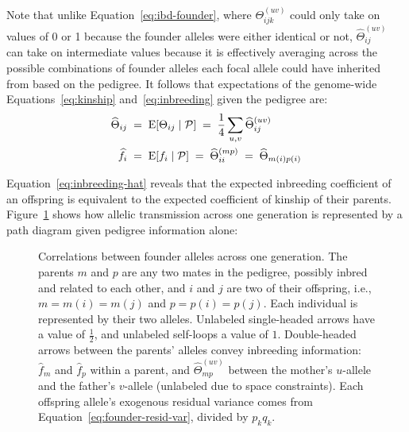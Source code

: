 \documentclass[12pt]{article}
\numberwithin{equation}{section}
\begin{document}
Note that unlike Equation~\eqref{eq:ibd-founder}, where $\Theta^{(uv)}_{ijk}$ could only take on values of 0 or 1 because the founder alleles were either identical or not, $\widehat\Theta^{(uv)}_{ij}$ can take on intermediate values because it is effectively averaging across the possible combinations of founder alleles each focal allele could have inherited from based on the pedigree.
It follows that expectations of the genome-wide Equations~\eqref{eq:kinship} and~\eqref{eq:inbreeding} given the pedigree are:
\begin{subequations}\label{eq:pedigree-coefs}
\begin{align}
    \widehat\Theta_{ij} \;&=\; \mathrm{E}[\Theta_{ij} \mid \mathcal{P}] \;=\; \frac14 \sum_{u,v} \widehat\Theta^{(uv)}_{ij} \label{eq:kinship-hat} \\
    \widehat{f}_i \;&=\; \mathrm{E}[f_i \mid \mathcal{P}] \;=\; \widehat\Theta^{(mp)}_{ii} \;=\; \widehat\Theta_{m(i)p(i)} \label{eq:inbreeding-hat}
\end{align}
\end{subequations}

Equation~\eqref{eq:inbreeding-hat} reveals that the expected inbreeding coefficient of an offspring is equivalent to the expected coefficient of kinship of their parents.
Figure~\ref{fig:ibd-one-gen} shows how allelic transmission across one generation is represented by a path diagram given pedigree information alone:

\begin{figure}[H]
    \begin{floatcard}
        
        \caption{%
            Correlations between founder alleles across one generation.
            The parents $m$ and $p$ are any two mates in the pedigree, possibly inbred and related to each other, and $i$ and $j$ are two of their offspring, i.e., $m = m(i) = m(j)$ and $p = p(i) = p(j)$.
            Each individual is represented by their two alleles.
            Unlabeled single-headed arrows have a value of $\tfrac12$, and unlabeled self-loops a value of $1$.
            Double-headed arrows between the parents' alleles convey inbreeding information: $\widehat{f}_m$ and $\widehat{f}_p$ within a parent, and $\widehat\Theta^{(uv)}_{mp}$ between the mother's $u$-allele and the father's $v$-allele (unlabeled due to space constraints).
            Each offspring allele's exogenous residual variance comes from Equation~\eqref{eq:founder-resid-var}, divided by $p_k q_k$.%
        }
        \label{fig:ibd-one-gen}
    \end{floatcard}
\end{figure}
\end{document}
